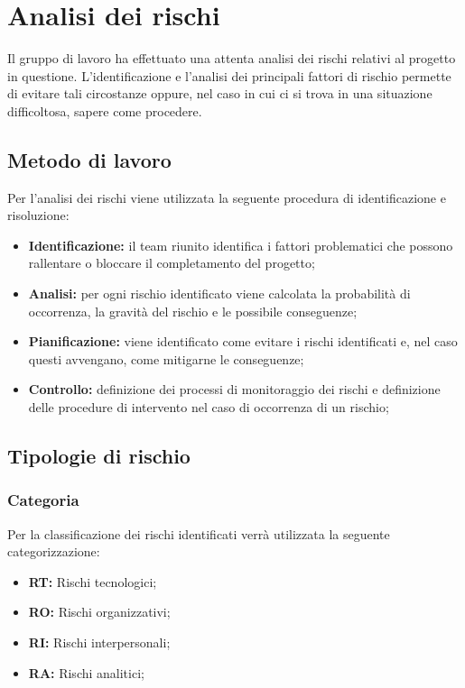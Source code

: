 \section{Analisi dei rischi}

Il gruppo di lavoro ha effettuato una attenta analisi dei rischi relativi al progetto in questione. L'identificazione e l'analisi dei principali fattori di rischio permette di evitare tali circostanze oppure, nel caso in cui ci si trova in una situazione difficoltosa, sapere come procedere.

\subsection{Metodo di lavoro}
Per l'analisi dei rischi viene utilizzata la seguente procedura di identificazione e risoluzione:
\begin{itemize}
	\item \textbf{Identificazione:} il team riunito identifica i fattori problematici che possono rallentare o bloccare il completamento del progetto;
	\item \textbf{Analisi:} per ogni rischio identificato viene calcolata la probabilità di occorrenza, la gravità del rischio e le possibile conseguenze;
	\item \textbf{Pianificazione:} viene identificato come evitare i rischi identificati e, nel caso questi avvengano, come mitigarne le conseguenze;
	\item \textbf{Controllo:} definizione dei processi di monitoraggio dei rischi e definizione delle procedure di intervento nel caso di occorrenza di un rischio;
\end{itemize}


\subsection{Tipologie di rischio}
\subsubsection{Categoria}
Per la classificazione dei rischi identificati verrà utilizzata la seguente categorizzazione:
\begin{itemize}
	\item \textbf{RT:} Rischi tecnologici;
	\item \textbf{RO:} Rischi organizzativi;
	\item \textbf{RI:} Rischi interpersonali;
	\item \textbf{RA:} Rischi analitici;
\end{itemize}
